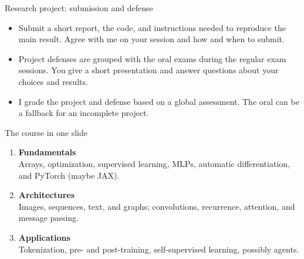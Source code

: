 \documentclass[14pt,aspectratio=169,notheorems]{beamer}
\begin{document}
\begin{frame}{Research project: submission and defense}
	\small

	\begin{itemize}
	\item Submit a short report, the code, and instructions needed to reproduce the main result. Agree with me on your session and how and when to submit.
	\item Project defenses are grouped with the oral exams during the regular exam sessions. You give a short presentation and answer questions about your choices and results.
	\item I grade the project and defense based on a global assessment. The oral can be a fallback for an incomplete project.
	\end{itemize}

\end{frame}

\begin{frame}{The course in one slide}

	\begin{enumerate}
		\item \textbf{Fundamentals}\\
		      Arrays, optimization, supervised learning, MLPs, automatic differentiation, and PyTorch (maybe JAX).
		\item \textbf{Architectures}\\
		      Images, sequences, text, and graphs; convolutions, recurrence, attention, and message passing.
		\item \textbf{Applications}\\
		      Tokenization, pre- and post-training, self-supervised learning, possibly agents.
	\end{enumerate}

\end{frame}
\end{document}
